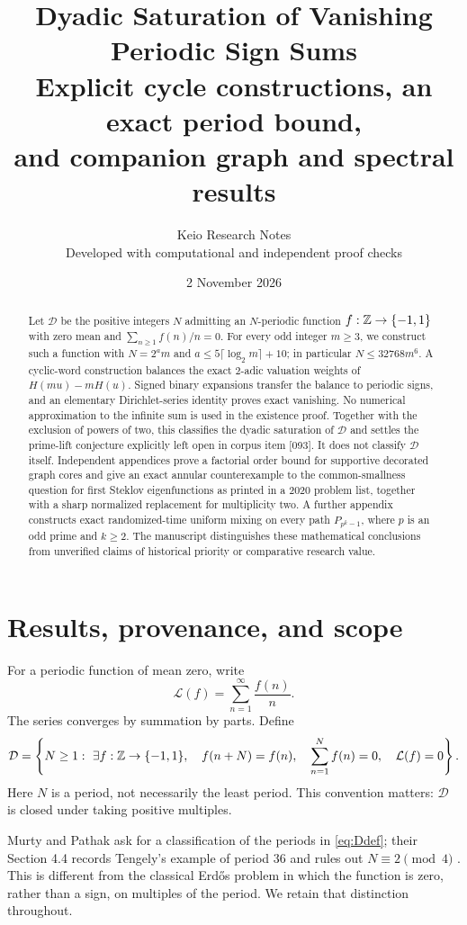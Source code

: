 \documentclass[11pt,a4paper]{article}
\title{Dyadic Saturation of Vanishing Periodic Sign Sums\\[5pt]
\large Explicit cycle constructions, an exact period bound,\\and companion graph and spectral results}
\author{Keio Research Notes\\\small Developed with computational and independent proof checks}
\date{2 November 2026}
\theoremstyle{definition}\newtheorem{definition}[theorem]{Definition}
\theoremstyle{remark}\newtheorem{remark}[theorem]{Remark}
\newcommand{\Dset}{\mathcal D}\newcommand{\wt}{\operatorname{wt}}
\newcommand{\LL}{\mathcal L}\newcommand{\UU}{\mathcal U}
\begin{document}
\maketitle
\begin{abstract}
Let $\Dset$ be the positive integers $N$ admitting an $N$-periodic function
$f:\mathbb Z\to\{-1,1\}$ with zero mean and $\sum_{n\ge1}f(n)/n=0$.
For every odd integer $m\ge3$, we construct such a function with
$N=2^a m$ and $a\le5\lceil\log_2m\rceil+10$; in particular
$N\le32768m^6$. A cyclic-word construction balances the exact
$2$-adic valuation weights of $H(mu)-mH(u)$. Signed binary expansions
transfer the balance to periodic signs, and an elementary Dirichlet-series
identity proves exact vanishing. No numerical approximation to the
infinite sum is used in the existence proof. Together with the exclusion
of powers of two, this classifies the dyadic saturation of $\Dset$ and
settles the prime-lift conjecture explicitly left open in corpus item
[093]. It does not classify $\Dset$ itself. Independent appendices
prove a factorial order bound for supportive decorated graph cores and
give an exact annular counterexample to the common-smallness question
for first Steklov eigenfunctions as printed in a 2020 problem list,
together with a sharp normalized replacement for multiplicity two.
A further appendix constructs exact randomized-time uniform mixing
on every path $P_{p^k-1}$, where $p$ is an odd prime and $k\ge2$.
The manuscript distinguishes these mathematical conclusions from
unverified claims of historical priority or comparative research value.
\end{abstract}

\section{Results, provenance, and scope}
For a periodic function of mean zero, write
\[
 \LL(f)=\sum_{n=1}^{\infty}\frac{f(n)}n.
\]
The series converges by summation by parts. Define
\begin{equation}\label{eq:Ddef}
 \Dset=\left\{N\ge1:\ \exists f:\Z\to\{-1,1\},\quad
 f(n+N)=f(n),\quad \sum_{n=1}^N f(n)=0,\quad \LL(f)=0\right\}.
\end{equation}
Here $N$ is a period, not necessarily the least period. This convention
matters: $\Dset$ is closed under taking positive multiples.

Murty and Pathak ask for a classification of the periods in
\eqref{eq:Ddef}; their Section 4.4 records Tengely's example of period
$36$ and rules out $N\equiv2\pmod4$ \cite{MP2022}. This is different
from the classical Erd\H{o}s problem in which the function is zero,
rather than a sign, on multiples of the period. We retain that distinction
throughout.
\end{document}
